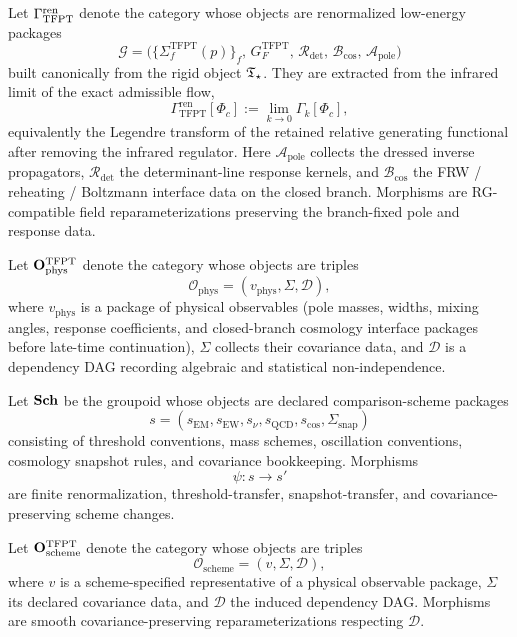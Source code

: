 \begin{definition}
\label{def:renormalized-low-energy-package}
Let $\Gamma_{\mathrm{TFPT}}^{\mathrm{ren}}$ denote the category whose objects are renormalized low-energy packages
\[
\mathcal G=
\bigl(
\{\Sigma_f^{\mathrm{TFPT}}(p)\}_f,\,
G_F^{\mathrm{TFPT}},\,
\mathcal R_{\det},\,
\mathcal B_{\mathrm{cos}},\,
\mathcal A_{\mathrm{pole}}
\bigr)
\]
built canonically from the rigid object $\mathfrak T_{\star}$. They are extracted from the infrared limit of the
exact admissible flow,
\[
\Gamma_{\mathrm{TFPT}}^{\mathrm{ren}}[\Phi_c]
:=
\lim_{k\to0}\Gamma_k[\Phi_c],
\]
equivalently the Legendre transform of the retained relative generating functional after removing
the infrared regulator. Here $\mathcal A_{\mathrm{pole}}$ collects the dressed inverse propagators,
$\mathcal R_{\det}$ the determinant-line response kernels, and $\mathcal B_{\mathrm{cos}}$ the
FRW / reheating / Boltzmann interface data on the closed branch. Morphisms are RG-compatible field
reparameterizations preserving the branch-fixed pole and response data.
\end{definition}

\begin{definition}
\label{def:physical-observable-category}
Let $\mathbf O_{\mathrm{phys}}^{\mathrm{TFPT}}$ denote the category whose objects are triples
\[
\mathcal O_{\mathrm{phys}}=(v_{\mathrm{phys}},\Sigma,\mathcal D),
\]
where $v_{\mathrm{phys}}$ is a package of physical observables (pole masses, widths, mixing angles,
response coefficients, and closed-branch cosmology interface packages before late-time
continuation), $\Sigma$ collects their covariance data, and
$\mathcal D$ is a dependency DAG recording algebraic and statistical non-independence.
\end{definition}

\begin{definition}
\label{def:scheme-groupoid}
Let $\mathbf{Sch}$ be the groupoid whose objects are declared comparison-scheme packages
\[
s=(s_{\mathrm{EM}},s_{\mathrm{EW}},s_{\nu},s_{\mathrm{QCD}},s_{\mathrm{cos}},\Sigma_{\mathrm{snap}})
\]
consisting of threshold conventions, mass schemes, oscillation conventions, cosmology snapshot
rules, and covariance bookkeeping. Morphisms
\[
\psi:s\to s'
\]
are finite renormalization, threshold-transfer, snapshot-transfer, and covariance-preserving
scheme changes.
\end{definition}

\begin{definition}
\label{def:obs-category}
Let $\mathbf O_{\mathrm{scheme}}^{\mathrm{TFPT}}$ denote the category whose objects are triples
\[
\mathcal O_{\mathrm{scheme}}=(v,\Sigma,\mathcal D),
\]
where $v$ is a scheme-specified representative of a physical observable package, $\Sigma$ its
declared covariance data, and $\mathcal D$ the induced dependency DAG. Morphisms are smooth
covariance-preserving reparameterizations respecting $\mathcal D$.
\end{definition}

